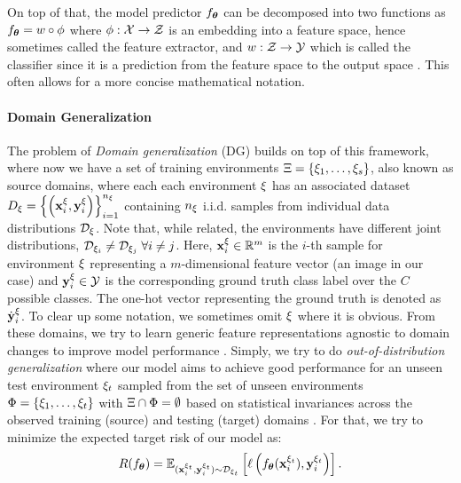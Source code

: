 On top of that, the model predictor $f_{\boldsymbol{\theta}}$ can be decomposed into two functions as $f_{\boldsymbol{\theta}} = w \circ \phi$ where $\phi: \mathcal{X} \rightarrow \mathcal{Z}$ is an embedding into a feature space, hence sometimes called the feature extractor, and $w: \mathcal{Z} \rightarrow \mathcal{Y}$ which is called the classifier since it is a prediction from the feature space to the output space \citep{gulrajani2020search, MotiianPAD17}. This often allows for a more concise mathematical notation.

\paragraph{Domain Generalization}
The problem of \emph{Domain generalization} (DG) builds on top of this framework, where now we have a set of training environments $\Xi = \left\{\xi_{1}, \ldots, \xi_{s} \right\}$, also known as source domains, where each each environment $\xi$ has an associated dataset $D_{\xi}=\left\{\left(\mathbf{x}_i^{\xi}, \mathbf{y}_i^{\xi}\right)\right\}_{i=1}^{n_{\xi}}$ containing $n_\xi$ i.i.d. samples from individual data distributions $\mathcal{D}_\xi$. Note that, while related, the environments have different joint distributions, \ie $\mathcal{D}_{\xi_i}\neq \mathcal{D}_{\xi_j} \;\forall i\neq j$. Here, $\mathbf{x}_i^\xi \in \mathbb{R}^{m}$ is the $i$-th sample for environment $\xi$ representing a $m$-dimensional feature vector (\ie an image in our case) and $\mathbf{y}_i^\xi \in \mathcal{Y}$ is the corresponding ground truth class label over the $C$ possible classes. The one-hot vector representing the ground truth is denoted as $\dot{\mathbf{y}}_i^\xi$. To clear up some notation, we sometimes omit $\xi$ where it is obvious. From these domains, we try to learn generic feature representations agnostic to domain changes to improve model performance \citep{seo2019learning}. Simply, we try to do \emph{out-of-distribution generalization} where our model aims to achieve good performance for an unseen test environment $\xi_t$ sampled from the set of unseen environments $\Phi = \left\{\xi_{1}, \ldots, \xi_{t}\right\}$ with $\Xi \cap \Phi =\emptyset$ based on statistical invariances across the observed training (source) and testing (target) domains \citep{gulrajani2020search, huang2020selfchallenging}. For that, we try to minimize the expected target risk of our model as:
\begin{equation}
\label{eq:domain_risk}
    R(f_{\boldsymbol{\theta}}) = \mathbb{E}_{(\mathbf{x}_i^{\xi_t}, \mathbf{y}_i^{\xi_t}) \sim \mathcal{D}_{\xi_t}}\left[\ell\left(f_{\boldsymbol{\theta}}(\mathbf{x}_i^{\xi_t}), \mathbf{y}_i^{\xi_t}\right)\right].
\end{equation}
